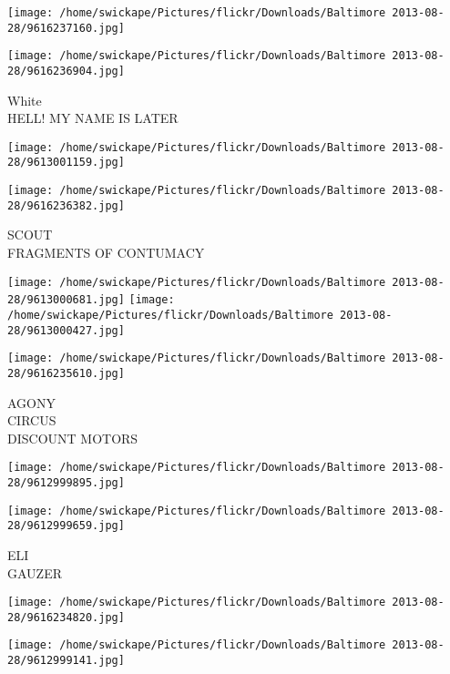 \documentclass[10pt,letterpaper]{article}
\begin{document}
\texttt{[image: /home/swickape/Pictures/flickr/Downloads/Baltimore 2013-08-28/9616237160.jpg]}

\vspace{0.25in}
\texttt{[image: /home/swickape/Pictures/flickr/Downloads/Baltimore 2013-08-28/9616236904.jpg]}

White\\
HELL! MY NAME IS LATER\\
\pagebreak

\texttt{[image: /home/swickape/Pictures/flickr/Downloads/Baltimore 2013-08-28/9613001159.jpg]}

\vspace{0.25in}
\texttt{[image: /home/swickape/Pictures/flickr/Downloads/Baltimore 2013-08-28/9616236382.jpg]}

SCOUT\\
FRAGMENTS OF CONTUMACY\\
\pagebreak

\texttt{[image: /home/swickape/Pictures/flickr/Downloads/Baltimore 2013-08-28/9613000681.jpg]}
\texttt{[image: /home/swickape/Pictures/flickr/Downloads/Baltimore 2013-08-28/9613000427.jpg]}

\vspace{0.25in}
\texttt{[image: /home/swickape/Pictures/flickr/Downloads/Baltimore 2013-08-28/9616235610.jpg]}

AGONY\\
CIRCUS\\
DISCOUNT MOTORS\\
\pagebreak

\texttt{[image: /home/swickape/Pictures/flickr/Downloads/Baltimore 2013-08-28/9612999895.jpg]}

\vspace{0.25in}
\texttt{[image: /home/swickape/Pictures/flickr/Downloads/Baltimore 2013-08-28/9612999659.jpg]}

ELI\\
GAUZER\\
\pagebreak

\texttt{[image: /home/swickape/Pictures/flickr/Downloads/Baltimore 2013-08-28/9616234820.jpg]}

\vspace{0.25in}
\texttt{[image: /home/swickape/Pictures/flickr/Downloads/Baltimore 2013-08-28/9612999141.jpg]}
\end{document}
